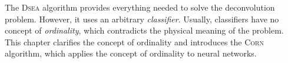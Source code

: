 The \textsc{Dsea} algorithm provides everything needed to solve the deconvolution problem.
However,
it uses an arbitrary \emph{classifier}.
Usually,
  classifiers have no concept of \emph{ordinality},
which contradicts the physical meaning of the problem.
%
This chapter
  clarifies the concept of ordinality
  and
  introduces the \textsc{Corn} algorithm,
    which applies the concept of ordinality to neural networks.
